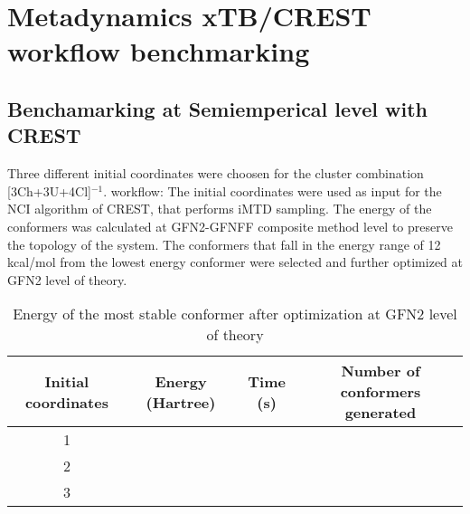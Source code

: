\section{Metadynamics xTB/CREST workflow benchmarking}
\subsection{Benchamarking at Semiemperical level with CREST}
Three different initial coordinates were choosen for the cluster combination
[3Ch+3U+4Cl]$^{-1}$.
workflow:
The initial coordinates were used as input for the NCI algorithm of CREST, that performs iMTD sampling.
The energy of the conformers was calculated at GFN2-GFNFF composite method level to preserve the topology of the system.
The conformers that fall in the energy range of 12 kcal/mol from the lowest energy conformer were selected and further optimized at GFN2 level of theory.
\begin{table}[H]
\centering
\begin{tabular}{|c|c|c|c|} \hline
\textbf{Initial coordinates} & \textbf{Energy (Hartree)} & \textbf{Time (s)} & \textbf{Number of conformers generated} \\ \hline
1 & & & \\ \hline
2 & & & \\ \hline
3 & & & \\ \hline
\end{tabular}
\caption{Energy of the most stable conformer after optimization at GFN2 level of theory}
\end{table}
